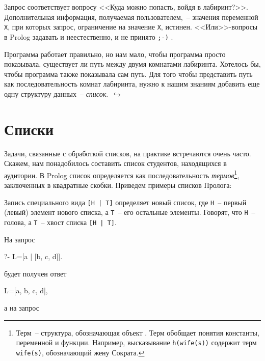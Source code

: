 \documentclass[a4paper,14pt, openany, twoside, final]{extbook} %
\newcommand{\goforth}[1]{$\,\hookrightarrow$\pageref{#1}}
\begin{document}
Запрос соответствует вопросу <<Куда можно попасть, войдя в лабиринт?>>.  Дополнительная информация, получаемая пользователем,~-- значения переменной \texttt{X}, при которых запрос, ограничение на значение \texttt{X}, истинен.  <<Или>>-вопросы в Prolog задавать и неестественно, и не принято \texttt{;-)} .

Программа работает правильно, но нам мало, чтобы программа просто показывала, существует ли путь между двумя комнатами лабиринта.  Хотелось бы, чтобы программа также показывала сам путь.  Для того чтобы представить путь как последовательность комнат лабиринта, нужно к нашим знаниям добавить еще одну структуру данных~-- \emph{список}. \goforth{par:mazelist}

\section{Списки}

Задачи, связанные с обработкой списков, на практике встречаются очень часто. Скажем, нам понадобилось составить список студентов, находящихся в аудитории.  В Prolog список определяется как последовательность \emph{термов}\footnote{Терм~-- структура, обозначающая объект \cite{AppLog}.  Терм обобщает понятия константы, переменной и функции.  Например, высказывание \texttt{h(wife(s))} содержит терм \texttt{wife(s)}, обозначающий жену Сократа.}, заключенных в квадратные скобки.  Приведем примеры списков Пролога:

\begin{proexp}
\end{proexp}

  Запись специального вида {\tt [H | T]} определяет новый список, где {\tt Н}~-- первый (левый) элемент нового списка, а {\tt Т}~-- его остальные элементы.  Говорят, что {\tt Н}~-- голова, а {\tt Т}~-- хвост списка {\tt [H | T]}.\enlargethispage{-2em}

\noindent{}На запрос

\begin{proexp}
?- L=[a | [b, c, d]].
\end{proexp}

\noindent будет получен ответ

\begin{proexp}
L=[a, b, c, d],
\end{proexp}

\noindent а на запрос
\end{document}
